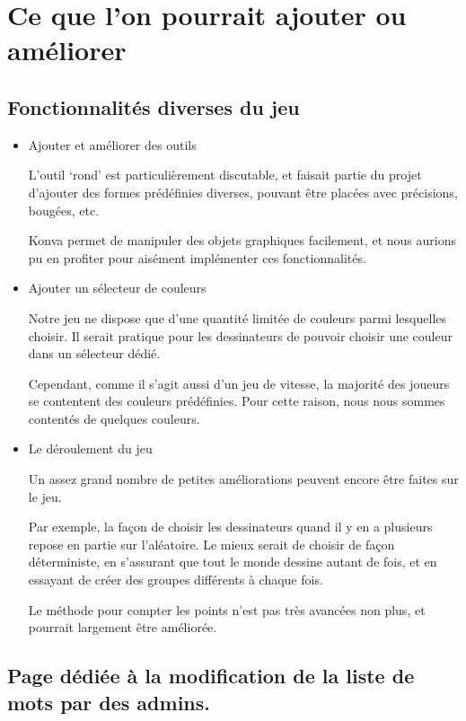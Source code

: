 \documentclass[11pt,a4paper]{article}
\begin{document}
    \section{Ce que l'on pourrait ajouter ou améliorer}
        \subsection*{Fonctionnalités diverses du jeu}
            \begin{itemize}
                \item Ajouter et améliorer des outils
                
                L'outil `rond' est particulièrement discutable,
                et faisait partie du projet d'ajouter des formes prédéfinies diverses,
                pouvant être placées avec précisions, bougées, etc.

                Konva permet de manipuler des objets graphiques facilement,
                et nous aurions pu en profiter pour aisément implémenter ces fonctionnalités.
                \item Ajouter un sélecteur de couleurs
                
                Notre jeu ne dispose que d'une quantité limitée de couleurs parmi lesquelles choisir.
                Il serait pratique pour les dessinateurs de pouvoir choisir une couleur dans un sélecteur dédié.

                Cependant, comme il s'agit aussi d'un jeu de vitesse,
                la majorité des joueurs se contentent des couleurs prédéfinies.
                Pour cette raison, nous nous sommes contentés de quelques couleurs.
                \item Le déroulement du jeu
                
                Un assez grand nombre de petites améliorations peuvent encore être faites sur le jeu.

                Par exemple, la façon de choisir les dessinateurs quand il y en a plusieurs repose en partie sur l'aléatoire.
                Le mieux serait de choisir de façon déterministe, en s'assurant que tout le monde dessine autant de fois,
                et en essayant de créer des groupes différents à chaque fois.

                Le méthode pour compter les points n'est pas très avancées non plus, et pourrait largement être améliorée.
            \end{itemize}
        \subsection*{Page dédiée à la modification de la liste de mots par des admins.}
\end{document}
